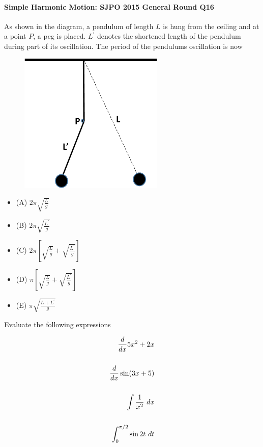 \documentclass{article}
\begin{document}
\paragraph{Simple Harmonic Motion: SJPO 2015 General Round Q16}
As shown in the diagram, a pendulum of length $L$ is hung from the ceiling and at a point $P$, a peg is placed. $L^{\prime}$ denotes the shortened length of the pendulum during part of its oscillation. The period of the pendulums oscillation is now
\begin{figure}
\includegraphics[width=0.9\linewidth]{images/2015q16.png}
\end{figure}
\begin{itemize}
\item[](A) $2 \pi \sqrt{\frac{L}{g}}$
\item[](B) $2 \pi \sqrt{\frac{L^{\prime}}{g}}$
\item[](C) $2 \pi\left[\sqrt{\frac{L}{g}}+\sqrt{\frac{L^{\prime}}{g}}\right]$
\item[](D) $\pi\left[\sqrt{\frac{L}{g}}+\sqrt{\frac{L^{\prime}}{g}}\right]$
\item[](E) $\pi \sqrt{\frac{L+L^{\prime}}{g}}$
\end{itemize}

\newpage
Evaluate the following expressions

\begin{align}
    \frac{d}{dx} 5 x^2 + 2 x \notag \\ \notag \\
    \frac{d}{dx} \sin (3x+5) \notag \\ \notag \\
    \int \frac{1}{x^2}\ dx \notag \\ \notag \\
    \int_0^{\pi/2} \sin 2t\ dt \notag  
\end{align}
\end{document}
